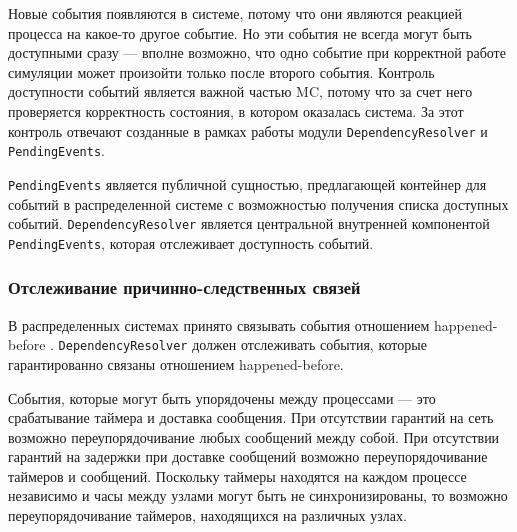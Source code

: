 \documentclass[a4paper,12pt]{extarticle}
\newcommand{\mc}[0]{MC}
\begin{document}
Новые события появляются в системе, потому что они являются реакцией процесса на какое-то другое событие.
Но эти события не всегда могут быть доступными сразу --- вполне возможно, что одно событие при корректной работе симуляции может произойти только после второго события. 
Контроль доступности событий является важной частью \mc, потому что за счет него проверяется корректность состояния, в котором оказалась система.
За этот контроль отвечают созданные в рамках работы модули \texttt{DependencyResolver} и \texttt{PendingEvents}.

\texttt{PendingEvents} является публичной сущностью, предлагающей контейнер для событий в распределенной системе с возможностью получения списка доступных событий.
\texttt{DependencyResolver} является центральной внутренней компонентой \texttt{PendingEvents}, которая отслеживает доступность событий.

\subsubsection{Отслеживание причинно-следственных связей}
\label{dependenciesdefinition}

В распределенных системах принято связывать события отношением happened-before \cite{b27}.
\texttt{DependencyResolver} должен отслеживать события, которые гарантированно связаны отношением happened-before.

События, которые могут быть упорядочены между процессами --- это срабатывание таймера и доставка сообщения.
При отсутствии гарантий на сеть возможно переупорядочивание любых сообщений между собой.
При отсутствии гарантий на задержки при доставке сообщений возможно переупорядочивание таймеров и сообщений.
Поскольку таймеры находятся на каждом процессе независимо и часы между узлами могут быть не синхронизированы, то возможно переупорядочивание таймеров, находящихся на различных узлах.
\end{document}
